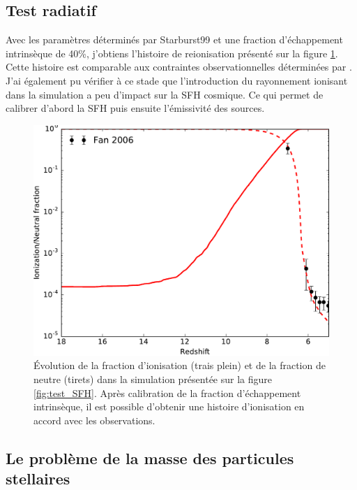 \clearpage

\subsection{Test radiatif}
Avec les paramètres déterminés par Starburst99 et une fraction d'échappement intrinsèque de 40\%, j'obtiens l'histoire de reionisation présenté sur la figure \ref{fig:test_xion}.
Cette histoire est comparable aux contraintes observationnelles déterminées par \cite{fan_constraining_2006}.
J'ai également pu vérifier à ce stade que l'introduction du rayonnement ionisant dans la simulation a peu d'impact sur la \ac{SFH} cosmique.
Ce qui permet de calibrer d'abord la \ac{SFH} puis ensuite l'émissivité des sources.

\begin{figure}
        \includegraphics[width=.95\linewidth]{img/02/xion.pdf} 
        \caption[Histoire d'ionisation]{Évolution de la fraction d'ionisation (trais plein) et de la fraction de neutre (tirets) dans la simulation présentée sur la figure \ref{fig:test_SFH}.
        Après calibration de la fraction d’échappement intrinsèque, il est possible d'obtenir une histoire d'ionisation en accord avec les observations.
 		\label{fig:test_xion}}
\end{figure}

\subsection{Le problème de la masse des particules stellaires}


